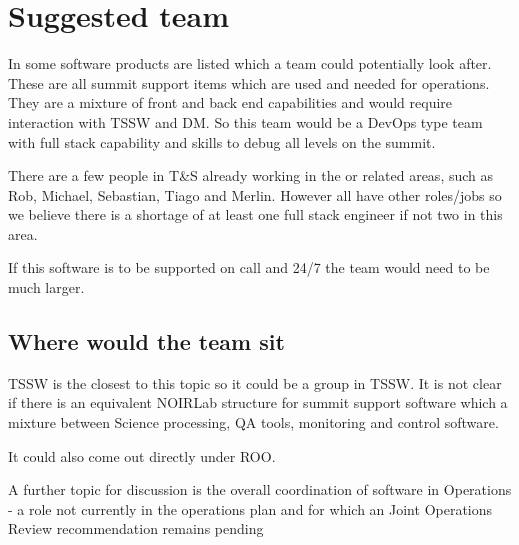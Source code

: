 \section{Suggested team} \label{sec:team}

In  some \gls{software} products are listed which a team could potentially look after.
These are all summit support items which are used and needed for operations.
They are a mixture of front and back end capabilities and would require interaction with TSSW and \gls{DM}.
So this team would be a DevOps type team with full \gls{stack} capability and skills to debug all levels on the summit.

There are a few people in T\&S already working in the or related areas, such as Rob, Michael, Sebastian, Tiago and Merlin.
However all have other roles/jobs so we believe there is a shortage of at least one full \gls{stack} engineer if not two in this area.


If this \gls{software} is to be supported on call and 24/7 the team would need to be much larger.


\subsection{Where would the team sit}
TSSW is the closest to this topic so it could be a group in TSSW.
It is not clear if there is an equivalent \gls{NOIRLab} structure for summit support \gls{software} which
a mixture between Science processing, \gls{QA} tools, \gls{monitoring} and control software.

It could also come out directly under \gls{ROO}.

A further topic for discussion is the overall coordination of software in \VRO  \gls{Operations} - a role not currently in the operations plan and for which an Joint \gls{Operations} \gls{Review} recommendation remains pending

